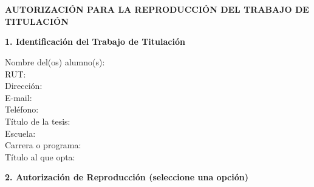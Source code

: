 
\chapter*{}  %
\thispagestyle{fancy}

\begin{center}
    {\large\textbf{AUTORIZACIÓN PARA LA REPRODUCCIÓN DEL TRABAJO DE TITULACIÓN}}
\end{center}

\vspace{1cm}

\noindent\textbf{1. Identificación del Trabajo de Titulación}

\vspace{0.5cm}

\begin{singlespace}
\noindent
Nombre del(os) alumno(s): \dotfill\\[0.3cm]
RUT: \dotfill\\[0.3cm]
Dirección: \dotfill\\[0.3cm]
E-mail: \dotfill\\[0.3cm]
Teléfono: \dotfill\\[0.3cm]
Título de la tesis: \dotfill\\[0.3cm]
Escuela: \dotfill\\[0.3cm]
Carrera o programa: \dotfill\\[0.3cm]
Título al que opta: \dotfill
\end{singlespace}

\vspace{1cm}

\noindent\textbf{2. Autorización de Reproducción (seleccione una opción)}

\vspace{0.5cm}

